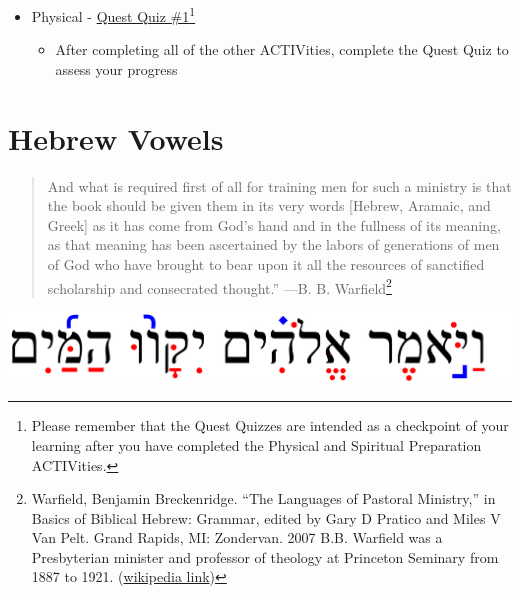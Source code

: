 \documentclass[
]{turabian-researchpaper}
\providecommand{\tightlist}{%
  \setlength{\itemsep}{0pt}\setlength{\parskip}{0pt}}
\begin{document}
\begin{itemize}
\begin{itemize}
    \begin{itemize}
    \tightlist
    \item
      \href{https://drive.google.com/file/d/1vG8hKR50KcB0NclBnRWYPYMCEnobjgLc/view?usp=sharing}{(Ruth Answer Key \#1)}
    \end{itemize}
  \end{itemize}
\item
  Physical - \href{https://docs.google.com/forms/d/e/1FAIpQLSeqHcE8PvfkOYbTu51cNO8sf-ln6CEnRrcTBUxM0EaeojSSsA/viewform}{Quest Quiz \#1}\footnote{Please remember that the Quest Quizzes are intended as a checkpoint of your learning after you have completed the Physical and Spiritual Preparation ACTIVities.}

  \begin{itemize}
  \tightlist
  \item
    After completing all of the other ACTIVities, complete the Quest Quiz to assess your progress
  \end{itemize}
\end{itemize}

\hypertarget{hebrew-vowels}{%
\section{Hebrew Vowels}\label{hebrew-vowels}}

\begin{quote}
And what is required first of all for training men for such a ministry is that the book should be given them in its very words {[}Hebrew, Aramaic, and Greek{]} as it has come from God's hand and in the fullness of its meaning, as that meaning has been ascertained by the labors of generations of men of God who have brought to bear upon it all the resources of sanctified scholarship and consecrated thought.''
---B. B. Warfield\footnote{Warfield, Benjamin Breckenridge. ``The Languages of Pastoral Ministry,'' in Basics of Biblical Hebrew: Grammar, edited by Gary D Pratico and Miles V Van Pelt. Grand Rapids, MI: Zondervan. 2007
  B.B. Warfield was a Presbyterian minister and professor of theology at Princeton Seminary from 1887 to 1921. (\href{https://en.wikipedia.org/wiki/B._B._Warfield}{wikipedia link})}
\end{quote}

\begin{center}\includegraphics[width=500pt]{images/02.Gen0109} \end{center}
\end{document}
